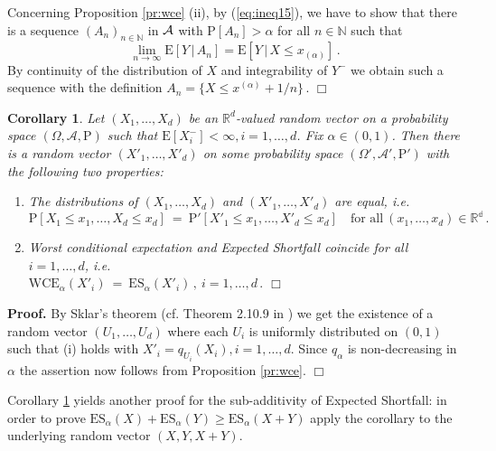 \documentclass[11pt,a4paper,leqno]{article}
\newtheorem{corollary}[theorem]{Corollary}
\begin{document}
Concerning Proposition \ref{pr:wce} (ii), by (\ref{eq:ineq15}), we have to show
that there is a sequence $(A_n)_{n\in\mathbb{N}}$ in $\cal A$ with
$\mathrm{P}[ A_n ] > \alpha$ for all $n \in \mathbb{N}$ such that 
$$
\lim_{n\to \infty} \mathrm{E}[ Y\,|\,A_n] = \mathrm{E}[ Y\,|\,X \le  x_{(\alpha)}]\,.
$$
By  continuity of the distribution of $X$ and integrability of 
$Y^-$ we obtain such a sequence with the definition
$
A_n  =  \{ X \le x^{(\alpha)} + 1/n \}\,.
$
\hfill $\Box$ 

\begin{corollary}
  \label{co:2}
Let $(X_1, \ldots, X_d)$ be an $\mathbb{R}^d$-valued random vector on a
probability space $(\Omega, \mathcal{A}, \mathrm{P})$ such that
$\mathrm{E}[X_i^-] < \infty, i = 1, \ldots, d$. Fix $\alpha \in (0,1)$. Then there is a
random vector $(X'_1, \ldots, X'_d)$ on some probability space
$(\Omega', \mathcal{A'}, \mathrm{P'})$ with the following two
properties:
\begin{enumerate}
\item  The distributions of $(X_1, \ldots, X_d)$ and $(X'_1, \ldots, X'_d)$ are
equal, i.e. 
$$
\mathrm{P}[X_1 \le x_1, \ldots, X_d \le x_d ]\ =\
\mathrm{P'}[X'_1 \le x_1, \ldots, X'_d \le x_d ]\quad\mbox{for all}\
(x_1, \ldots, x_d) \in \mathbb{R^d}\,.
$$
%
\item Worst conditional expectation and Expected Shortfall coincide
for all $i = 1, \ldots, d$, i.e.\\
$\mathrm{WCE}_\alpha(X'_i) \ = \ \mathrm{ES}_\alpha(X'_i)\,,\ 
i=1,\ldots, d\,.$ \hfill $\Box$
\end{enumerate}
\end{corollary}
%
\textbf{Proof.} By Sklar's theorem (cf. Theorem 2.10.9 in \cite{Nel99}) we get the
existence of a random vector $(U_1, \ldots, U_d)$ where each $U_i$ is
uniformly distributed on $(0,1)$ such that (i) holds with
$X'_i = q_{U_i}(X_i), i = 1,\ldots, d$. Since $q_\alpha$ is non-decreasing
in $\alpha$ the assertion now  follows from Proposition \ref{pr:wce}.
\hfill $\Box$

Corollary \ref{co:2} yields another proof for the sub-additivity of
Expected Shortfall: in order to prove $\mathrm{ES}_\alpha(X) + \mathrm{ES}_\alpha(Y)
\ge\mathrm{ES}_\alpha(X+Y)$ apply the corollary to the underlying
random vector $(X, Y, X+Y)$. 
\end{document}
